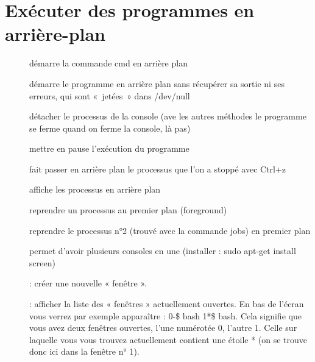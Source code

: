 \documentclass[letterpaper,10pt,french]{sphinxmanual}
\begin{document}
\chapter{Exécuter des programmes en arrière-plan}
\label{\detokenize{06-arriere_plan:executer-des-programmes-en-arriere-plan}}\label{\detokenize{06-arriere_plan::doc}}\begin{description}
\item[{}] \leavevmode
démarre la commande cmd en arrière plan

\item[{}] \leavevmode
démarre le programme en arrière plan sans récupérer sa sortie ni ses erreurs, qui sont « jetées » dans /dev/null

\item[{}] \leavevmode
détacher le processus de la console (ave les autres méthodes le programme se ferme quand on ferme la console, là pas)

\item[{}] \leavevmode
mettre en pause l’exécution du programme

\item[{}] \leavevmode
fait passer en arrière plan le processus que l’on a stoppé avec Ctrl+z

\item[{}] \leavevmode
affiche les processus en arrière plan

\item[{}] \leavevmode
reprendre un processus au premier plan (foreground)

\item[{}] \leavevmode
reprendre le processus n°2 (trouvé avec la commande jobs) en premier plan

\item[{}] \leavevmode
permet d’avoir plusieurs consoles en une (installer : sudo apt-get install screen)

 : créer une nouvelle « fenêtre ».

 : afficher la liste des « fenêtres » actuellement ouvertes. En bas de l’écran vous verrez par exemple apparaître : 0-\$ bash  1*\$ bash. Cela signifie que vous avez deux fenêtres ouvertes, l’une numérotée 0, l’autre 1. Celle sur laquelle vous vous trouvez actuellement contient une étoile * (on se trouve donc ici dans la fenêtre n° 1).


\end{description}
\end{document}
